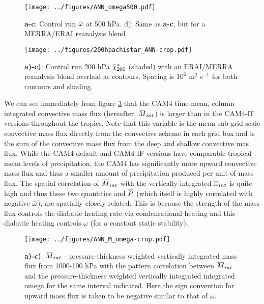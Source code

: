\documentclass[letterpaper,12pt,titlepage,oneside,final]{book}
\newcommand{\overbar}[1]{\mkern 1.5mu\overline{\mkern-1.5mu#1\mkern-1.5mu}\mkern 1.5mu}
\begin{document}
\begin{figure}[H]
\centering
\noindent\texttt{[image: ../figures/ANN\_omega500.pdf]}\hfill
\caption{\footnotesize \textbf{a-c}: Control run $\overbar{\omega}$ at 500 hPa. d): Same as \textbf{a-c}, but for a MERRA/ERAI reanalysis blend}
\label{fig:omega}
\end{figure}

\begin{figure}[H]
\centering
\noindent\texttt{[image: ../figures/200hpachistar\_ANN-crop.pdf]}\hfill
\caption{\footnotesize \textbf{a)-c)}: Control run 200 hPa $\overbar{\chi}^{*}_{200}$ (shaded) with an ERAI/MERRA reanalysis blend overlaid as contours. Spacing is $10^{6}$ m$^{2}$ s$^{-1}$ for both contours and shading.}
\label{fig:chistar}
\end{figure}

We can see immediately from figure \ref{fig:mcomeg} that the CAM4 time-mean, column integrated convective mass flux (hereafter, $\overbar{M}_{int}$) is larger than in the CAM4-IF versions throughout the tropics. Note that this variable is the mean sub-grid scale convective mass flux directly from the convective scheme in each grid box and is the sum of the convective mass flux from the deep and shallow convective mas flux. While the CAM4 default and CAM4-IF versions have comparable tropical mean levels of precipitation, the CAM4 has significantly more upward convective mass flux and thus a smaller amount of precipitation produced per unit of mass flux. The spatial correlation of $\overbar{M}_{int}$ with the vertically integrated $\overbar{\omega}_{int}$ is quite high and thus these two quantities and $\overbar{P}$ (which itself is highly correlated with negative $\overbar{\omega}$), are spatially closely related. This is because the strength of the mass flux controls the diabatic heating rate via condensational heating and this diabatic heating controls $\omega$ (for a constant static stability).

\begin{figure}[H]
\centering
\noindent\texttt{[image: ../figures/ANN\_M\_omega-crop.pdf]}\hfill
\caption{\footnotesize \textbf{a)-c)}: $\overbar{M}_{int}$ - pressure-thickness weighted vertically integrated mass flux from 1000-100 hPa with the pattern correlation between $\overbar{M}_{int}$ and the pressure-thickness weighted vertically integrated integrated omega for the same interval indicated. Here the sign convention for upward mass flux is taken to be negative similar to that of $\omega$.}
\label{fig:mcomeg}
\end{figure}
 
\end{document}
